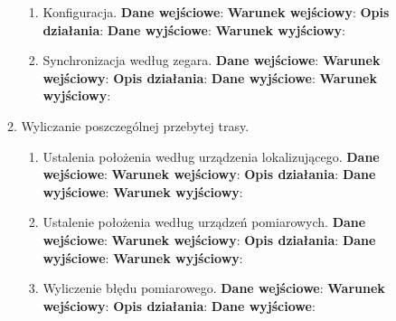 \documentclass[11pt]{article}
\begin{document}
\begin{enumerate}
\begin{enumerate}[label*=\arabic*.]
\begin{enumerate}[label*=\arabic*.]
				\item Konfiguracja. \newline
				\textbf{Dane wejściowe}:	\newline
				\textbf{Warunek wejściowy}: 		\newline   	
				\textbf{Opis działania}:	\newline
				\textbf{Dane wyjściowe}:	\newline
				\textbf{Warunek wyjściowy}:
				\item Synchronizacja według zegara. \newline
				\textbf{Dane wejściowe}:	\newline
				\textbf{Warunek wejściowy}: 		\newline   	
				\textbf{Opis działania}:	\newline
				\textbf{Dane wyjściowe}:	\newline
				\textbf{Warunek wyjściowy}:
			\end{enumerate}
			\item Wyliczanie poszczególnej przebytej trasy.
			\begin{enumerate}[label*=\arabic*.]
				\item Ustalenia położenia według urządzenia lokalizującego. \newline
				\textbf{Dane wejściowe}:	\newline
				\textbf{Warunek wejściowy}: 		\newline   	
				\textbf{Opis działania}:	\newline
				\textbf{Dane wyjściowe}:	\newline
				\textbf{Warunek wyjściowy}:
				\item Ustalenie położenia według urządzeń pomiarowych. \newline
				\textbf{Dane wejściowe}:	\newline
				\textbf{Warunek wejściowy}: 		\newline   	
				\textbf{Opis działania}:	\newline
				\textbf{Dane wyjściowe}:	\newline
				\textbf{Warunek wyjściowy}:
				\item Wyliczenie błędu pomiarowego. \newline
				\textbf{Dane wejściowe}:	\newline
				\textbf{Warunek wejściowy}: 		\newline   	
				\textbf{Opis działania}:	\newline
				\textbf{Dane wyjściowe}:	\newline

\end{enumerate}
\end{enumerate}
\end{enumerate}
\end{document}
